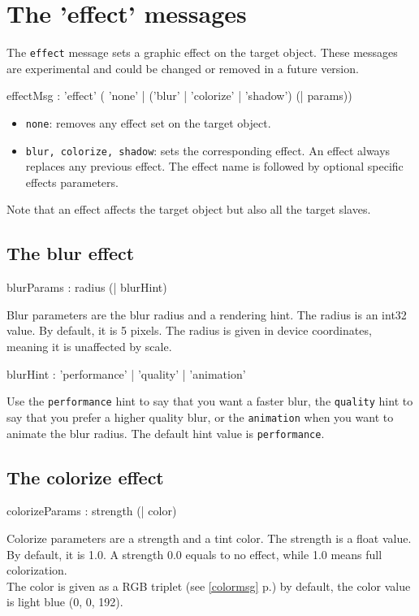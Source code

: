 \documentclass[a4paper,twoside]{report}
\newcommand{\sublevel}[1]	{\section{#1}}
\newcommand{\subsublevel}[1]	{\subsection{#1}}
\newcommand{\fullref}[1]	{\ref{#1} p.\pageref{#1}}
\newcommand{\OSC}[1]		{\texttt{#1}}
\begin{document}
\sublevel{The 'effect' messages}
\label{effectmsg}

The \OSC{effect} message sets a graphic effect on the target object. These messages are experimental and could be changed or removed in a future version.

\begin{rail}
effectMsg : 'effect' ( 'none'
		| ('blur'
		| 'colorize'
		| 'shadow') (| params)) 		
\end{rail}

\begin{itemize}
\item \OSC{none}: removes any effect set on the target object.
\item \OSC{blur, colorize, shadow}: sets the corresponding effect. An effect always replaces any previous effect. The effect name is followed by optional specific effects parameters.
\end{itemize}

Note that an effect affects the target object but also all the target slaves.

\subsublevel{The blur effect}

\begin{rail}
blurParams : radius (| blurHint)
\end{rail}

Blur parameters are the blur radius and a rendering hint. The radius is an int32 value. By default, it is 5 pixels. The radius is given in device coordinates, meaning it is unaffected by scale. 

\begin{rail}
blurHint : 'performance' | 'quality' | 'animation'
\end{rail}
Use the \OSC{performance} hint to say that you want a faster blur, the \OSC{quality} hint to say that you prefer a higher quality blur, or the \OSC{animation} when you want to animate the blur radius. The default hint value is \OSC{performance}.

\subsublevel{The colorize effect}

\begin{rail}
colorizeParams : strength (| color)
\end{rail}

Colorize parameters are a strength and a tint color. The strength is a float value. By default, it is 1.0. A strength 0.0 equals to no effect, while 1.0 means full colorization. \\
The color is given as a RGB triplet (see \fullref{colormsg}) by default, the color value is light blue (0, 0, 192).
\end{document}
